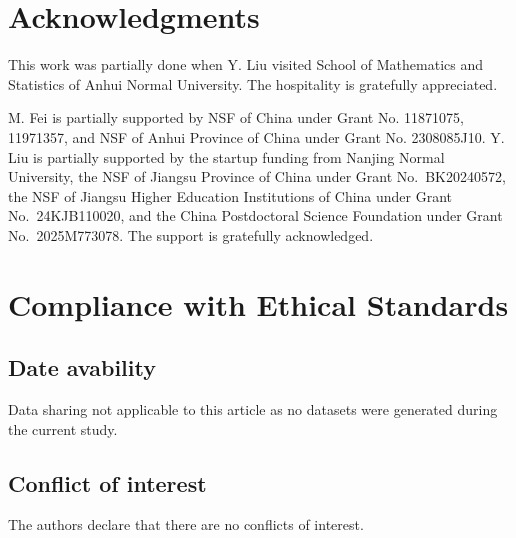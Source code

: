\documentclass[reqno,a4paper,11pt]{amsart}
\theoremstyle{plain}
\numberwithin{equation}{section}
\begin{document}
\section*{Acknowledgments}

This work was partially done when Y. Liu visited School of Mathematics and Statistics of Anhui Normal University. The hospitality is gratefully appreciated.

M. Fei is partially supported by NSF of China under Grant No. 11871075, 11971357, and NSF of Anhui Province of China under Grant No. 2308085J10. Y. Liu is partially supported by the startup funding from Nanjing Normal University, the NSF of Jiangsu Province  of China under Grant No.~BK20240572, the NSF of Jiangsu Higher Education Institutions of China under Grant No.~24KJB110020, and the China Postdoctoral Science Foundation under Grant No.~2025M773078. The support is gratefully acknowledged.


\section*{Compliance with Ethical Standards}
\subsection*{Date avability}
Data sharing not applicable to this article as no datasets were generated during the current study.
\subsection*{Conflict of interest}
The authors declare that there are no conflicts of interest.
\end{document}
